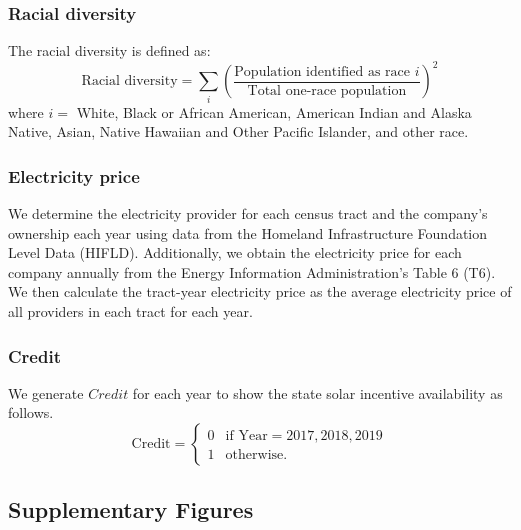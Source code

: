 \documentclass[11pt,twoside,letterpaper]{article}
\begin{document}
\subsubsection*{Racial diversity}
The racial diversity is defined as:
\begin{equation}
\text{Racial diversity} = \sum_{i} \left(\frac{\text{Population identified as race }i}{\text{Total one-race population}}\right)^2
\end{equation}
where $i = $ White, Black or African American, American Indian and Alaska Native,	Asian, Native Hawaiian and Other Pacific Islander, and other race.

\subsubsection*{Electricity price}
We determine the electricity provider for each census tract and the company's ownership each year using data from the Homeland Infrastructure Foundation Level Data (HIFLD). Additionally, we obtain the electricity price for each company annually from the Energy Information Administration's Table 6 (T6). We then calculate the tract-year electricity price as the average electricity price of all providers in each tract for each year.


\subsubsection*{Credit}
We generate $Credit$ for each year to show the state solar incentive availability as follows.  
\[
\text{Credit} = 
\begin{cases} 
 0 & \text{if } \text{Year} = 2017, 2018, 2019 \\
 1 & \text{otherwise.}
\end{cases} 
\]


\subsection{Supplementary Figures}
\end{document}
